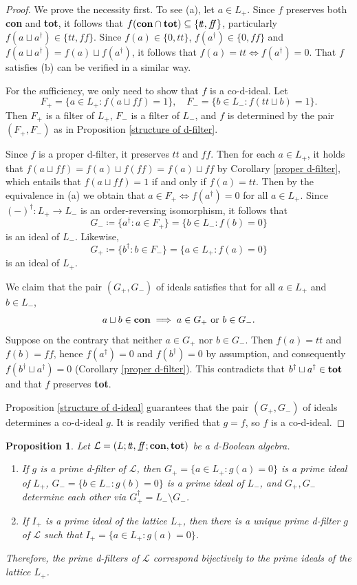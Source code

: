 \documentclass[11pt]{article}
\theoremstyle{plain}
\newtheorem{prop}[thm]{Proposition}
\theoremstyle{definition}
\newcommand{\dbt}{{t\!t}}
\newcommand{\dbf}{{f\!\!f}}
\newcommand{\lra}{\longrightarrow}
\begin{document}
\begin{proof} We prove the necessity first.   To see (a), let $a\in L_+$. Since $f$  preserves both {\bf con} and {\bf tot}, it follows that $f({\bf con}\cap{\bf tot})\subseteq\{\dbt,\dbf\}$, particularly $f(a\sqcup a^\dag)\in \{\dbt,\dbf\}$. Since $f(a)\in\{0,\dbt\}$, $f(a^\dag)\in\{0,\dbf\}$ and $f(a\sqcup a^\dag)= f(a)\sqcup f(a^\dag)$, it follows that $f(a)=\dbt\iff f(a^\dag)=0$. That $f$ satisfies (b) can be verified in a similar way.

For the  sufficiency, we only need to show that $f$ is a co-d-ideal.  Let $$F_+=\{a\in L_+:f(a\sqcup\dbf)=1\},\quad F_-=\{b\in L_-:f(\dbt\sqcup b)=1\}. $$ Then $F_+$ is a filter  of $L_+$,  $F_-$ is a filter of $L_-$, and $f$ is determined by the pair $(F_+,F_-)$ as in Proposition \ref{structure of d-filter}.

Since $f$ is a proper d-filter, it preserves $\dbt$ and $\dbf$. Then for each $a\in L_+$, it holds that $f(a\sqcup\dbf)=f(a)\sqcup f(\dbf)=f(a)\sqcup\dbf$ by Corollary \ref{proper d-filter},  which entails that $ f(a\sqcup\dbf)=1$  if and only if $f(a)=\dbt$. Then by the equivalence in (a) we obtain that $a\in F_+\iff f(a^\dag)=0 $ for all $a\in L_+$.
Since $(-)^\dag\colon L_+\lra L_-$ is an order-reversing isomorphism, it follows that $$G_-\coloneqq \{a^\dag:a\in F_+\}= \{b\in L_-: f(b)=0\}$$  is an ideal of $L_-$.  Likewise,  
$$G_+\coloneqq \{b^\dag:b\in F_-\}=\{a\in L_+:f(a)=0\} $$ is an ideal of $L_+$.   

We claim that the pair $(G_+,G_-)$ of ideals satisfies that  for all $a\in L_+$ and $b\in L_-$, $$ a\sqcup b\in{\bf con}\implies a\in G_+~\text{or}~b\in G_-.$$   
Suppose on the contrary that neither $a\in G_+$ nor $b\in G_-$. Then $f(a)=\dbt$ and $f(b)=\dbf$, hence $f(a^\dag)=0$ and $f(b^\dag)=0$ by assumption, and consequently $f(b^\dag\sqcup a^\dag)=0$ (Corollary \ref{proper d-filter}). This contradicts that $b^\dag\sqcup a^\dag\in{\bf tot}$ and that $f$ preserves {\bf tot}.   

Proposition \ref{structure of d-ideal} guarantees that  the pair $(G_+,G_-)$ of ideals determines a co-d-ideal $g$. It is readily verified that $g=f$, so $f$ is a co-d-ideal. \end{proof}
 
\begin{prop}Let $\mathcal{L}=(L;\dbt,\dbf;{\bf con},{\bf tot})$ be a d-Boolean algebra. \begin{enumerate}[label=\rm(\roman*)] \setlength{\itemsep}{0pt}
\item If $g$ is a prime d-filter of $\mathcal{L}$, then   $G_+=\{a\in L_+:g(a)=0\}$ is a prime ideal of $L_+$,   $G_-=\{b\in L_-:g(b)=0\}$ is a prime ideal of $L_-$,  and $G_+, G_-$ determine each other via $G_+^\dag=L_-\setminus G_-$. 
\item  If $I_+$ is a prime ideal of the lattice $L_+$, then there is a unique prime d-filter $g$ of  $\mathcal{L}$ such that $I_+=  \{a\in L_+: g(a)=0\}$. \end{enumerate} Therefore, the prime d-filters of $\mathcal{L}$ correspond bijectively to the prime ideals of the lattice $L_+$. \end{prop}
\end{document}
